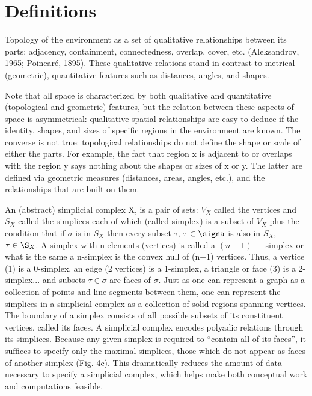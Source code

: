 \documentclass[onecollarge,runningheads]{svjour2}
\begin{document}


\section*{Definitions}
Topology of the environment as a set of qualitative relationships between its parts: adjacency, containment, connectedness, overlap, cover, etc. (Aleksandrov, 1965; Poincaré, 1895). 
These qualitative relations stand in contrast to metrical (geometric), quantitative features such as distances, angles, and shapes.

Note that all space is characterized by both qualitative and quantitative (topological and geometric) features, but the relation between these aspects of space is asymmetrical: qualitative spatial relationships are easy to deduce if the identity, shapes, and sizes of specific regions in the environment are known. 
The converse is not true: topological relationships do not define the shape or scale of either the parts. For example, the fact that region x is adjacent to or overlaps with the region y says nothing about the shapes or sizes of x or y. The latter are defined via geometric measures (distances, areas, angles, etc.), and the relationships that are built on them.

An (abstract) simplicial complex X, is a pair of sets: $V_X$ called the vertices and $S_X$ called the simplices each of which (called simplex) is a subset of $V_X$ plus the condition that if $\sigma$ is in $S_X$ then every subset $\tau$, $\tau \in \signa$ is also in $S_X$, $\tau \in \S_X$.
A simplex with n elements (vertices) is called a $(n-1)-$ simplex or what is the same a n-simplex is the convex hull of (n+1) vertices. Thus, a vertice (1) is a 0-simplex, an edge (2 vertices) is a 1-simplex, a triangle or face (3) is a 2-simplex... and subsets $\tau \in \sigma$ are faces of $\sigma$. Just as one can represent a graph as a collection of points and line segments between them, one can represent the simplices in a simplicial complex as a collection of solid regions spanning vertices.
The boundary of a simplex consists of all possible subsets of its constituent vertices, called its faces. 
A simplicial complex encodes polyadic relations through its simplices.
Because any given simplex is required to “contain all of its faces”, it suffices to specify only the maximal simplices, those which do not appear as faces of another simplex (Fig. 4c). This dramatically reduces the amount of data necessary to specify a simplicial complex, which helps make both conceptual work and computations feasible.
\end{document}
